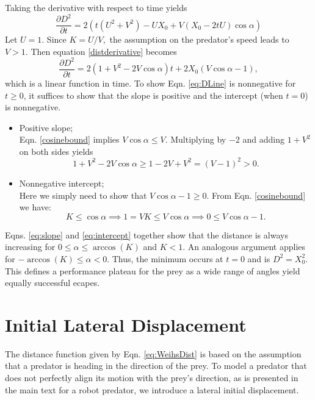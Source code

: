 \documentclass[12pt]{article}
\def\d{\partial}
\begin{document}
Taking the derivative with respect to time yields
%
\begin{equation}
\frac{\d D^2}{\d t}  = 2(t(U^2+V^2) - UX_0 + V(X_0-2tU)\cos\alpha)
\label{distderivative}
\end{equation}  
%
Let $U=1$. Since $K = U/V,$ the assumption on the predator's speed leads to $V > 1.$ 
Then equation \eqref{distderivative} becomes
%
\begin{equation}
\frac{\d D^2}{\d t}  = 2(1+V^2-2V\cos\alpha)t + 2X_0(V\cos\alpha -1), 
\label{eq:DLine}
\end{equation}
%
which is a linear function in time. To show Eqn. \ref{eq:DLine} is nonnegative for $t\geq0$, it suffices to show that the slope is positive and the intercept (when $t=0$) is nonnegative. 
%
\begin{itemize}
\item Positive slope; \\
Eqn. \ref{cosinebound} implies $V\cos\alpha \leq V$. Multiplying by $-2$ and adding $1+V^2$ on both sides yields  
\begin{equation}
1+V^2 -2V \cos\alpha \geq 1 -2V + V^2 = (V-1)^2 > 0.
\label{eq:slope}
\end{equation}

\item Nonnegative intercept; \\
Here we simply need to show that $V\cos \alpha -1 \geq 0.$ From Eqn. \ref{cosinebound} we have:
\begin{equation}
K \leq \cos\alpha \implies 1 = VK \leq V\cos\alpha \implies 0 \leq V\cos \alpha - 1.
\label{eq:intercept}
\end{equation}  
\end{itemize}
%
Eqns. \ref{eq:slope} and  \ref{eq:intercept} together show that the distance is always increasing for $0\leq \alpha \leq \arccos (K)$ and $K<1.$ An analogous argument applies for $-\arccos(K) \leq \alpha < 0.$ Thus, the minimum occurs at $t=0$ and is $D^2 = X_0^2.$ This defines a performance plateau for the prey as a wide range of angles yield equally successful ecapes. 



\section{Initial Lateral Displacement}
The distance function given by Eqn. \ref{eq:WeihsDist} is based on the assumption that a predator is heading in the direction of the prey. To model a predator that does not perfectly align its motion with the prey's direction, as is presented in the main text for a robot predator, we introduce a lateral initial displacement. 
\end{document}
